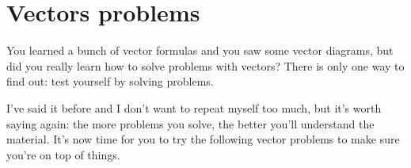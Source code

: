 
\section{Vectors problems}
\label{sec:vec_problems}

\vspace{-2mm}

You learned a bunch of vector formulas and you saw some vector diagrams,
but did you really learn how to solve problems with vectors?
There is only one way to find out: test yourself by solving problems.

I've said it before and I don't want to repeat myself too much,
but it's worth saying again: the more problems you solve, the better you'll understand the material.
It's now time for you to try the following vector problems to make sure you're on top of things.

\medskip

